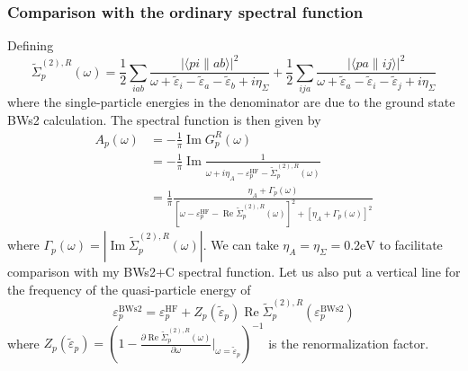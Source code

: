 \subsubsection{Comparison with the ordinary spectral function }
Defining
\begin{equation}
    \tilde{\Sigma}_p^{(2), R}(\omega)= \frac{1}{2} \sum_{i a b} \frac{|\langle p i \| a b\rangle|^2}{\omega+\tilde{\varepsilon}_i-\tilde{\varepsilon}_a-\tilde{\varepsilon}_b+i \eta_{\Sigma}} + \frac{1}{2} \sum_{i j a} \frac{|\langle p a \| i j\rangle|^2}{\omega+\tilde{\varepsilon}_a-\tilde{\varepsilon}_i-\tilde{\varepsilon}_j+i \eta_{\Sigma}}
\end{equation}
where the single-particle energies in the denominator are due to the ground state BWs2 calculation. The spectral function is then given by
\begin{align}
    A_p(\omega)&=-\frac{1}{\pi} \operatorname{Im} G_p^R(\omega)\\
    &= -\frac{1}{\pi} \operatorname{Im} \frac{1}{\omega+i \eta_A-\varepsilon_p^{\mathrm{HF}}-\tilde{\Sigma}_p^{(2), R}(\omega)} \\
&= \frac{1}{\pi} \frac{\eta_A+\Gamma_p(\omega)}{\left[\omega-\varepsilon_p^{\mathrm{HF}}-\operatorname{Re} \tilde{\Sigma}_p^{(2), R}(\omega)\right]^2+\left[\eta_A+\Gamma_p(\omega)\right]^2}
\end{align}
where $\Gamma_p(\omega)=|\operatorname{Im} \tilde{\Sigma}_p^{(2), R}(\omega)|$. We can take $\eta_A = \eta_{\Sigma}= 0.2 \text{eV}$ to facilitate comparison with my BWs2+C spectral function. Let us also put a vertical line for the frequency of the quasi-particle energy of 
\begin{equation}
    \varepsilon_p^{\text{BWs2}} = \varepsilon_p^{\mathrm{HF}}+ Z_p(\tilde{\varepsilon}_p)
\operatorname{Re} \tilde{\Sigma}_p^{(2), R}(\varepsilon_p^{\text{BWs2}})
\end{equation}
where $Z_p(\tilde{\varepsilon}_p) = \left(1-\frac{\partial \operatorname{Re} \tilde{\Sigma}_p^{(2), R}(\omega)}{\partial \omega}\big|_{\omega = \tilde{\varepsilon}_p}\right)^{-1}$ is the renormalization factor.
